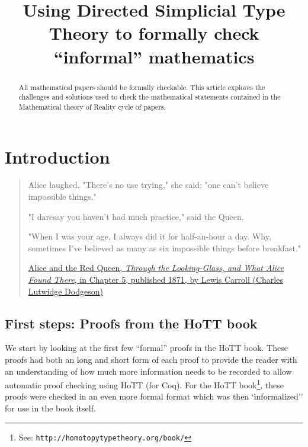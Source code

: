 \documentclass[a4paper]{amsart}
\begin{document}
\sloppy

\title[Using DiSimplicil Theory]{Using Directed Simplicial Type Theory 
to formally check ``informal'' mathematics}
%
%
 
%

\begin{abstract}
%
All mathematical papers should be formally checkable.  This article 
explores the challenges and solutions used to check the mathematical 
statements contained in the Mathematical theory of Reality cycle of 
papers.
%
\end{abstract}
\maketitle
\tableofcontents

\section{Introduction}

\begin{quote}
Alice laughed. "There's no use trying," she said: "one can't believe 
impossible things." 

"I daresay you haven't had much practice," said the Queen. 

"When I was your age, I always did it for half-an-hour a day. Why, 
sometimes I've believed as many as six impossible things before 
breakfast."

\href{http://en.wikiquote.org/wiki/Through_the_Looking-Glass}{Alice and the Red
Queen, \textit{Through the Looking-Glass, and What Alice Found There}, in Chapter 5, published 1871, by Lewis Carroll (Charles Lutwidge 
Dodgeson)}
\end{quote}

\subsection{First steps: Proofs from the HoTT book}

We start by looking at the first few ``formal'' proofs in the HoTT 
book.  These proofs had both an long and short form of each proof to 
provide the reader with an understanding of how much more information 
needs to be recorded to allow automatic proof checking using HoTT (for 
Coq).  For the HoTT book\footnote{See: 
\texttt{http://homotopytypetheory.org/book/}}, these proofs were checked 
in an even more formal format which was then `ìnformalized'' for use in 
the book itself.
\end{document}
